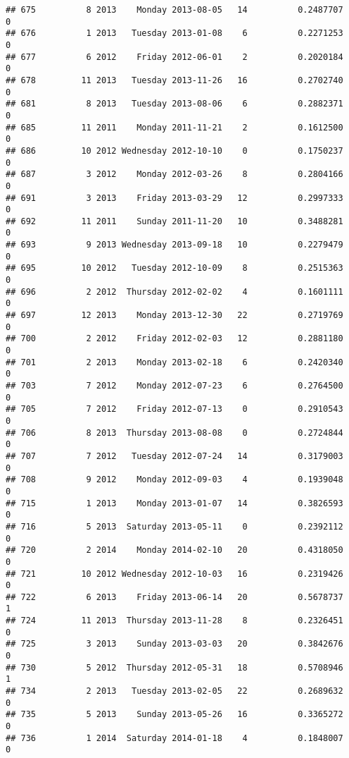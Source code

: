 \documentclass[
]{article}
\begin{document}
\begin{verbatim}
## 675          8 2013    Monday 2013-08-05   14          0.2487707             0
## 676          1 2013   Tuesday 2013-01-08    6          0.2271253             0
## 677          6 2012    Friday 2012-06-01    2          0.2020184             0
## 678         11 2013   Tuesday 2013-11-26   16          0.2702740             0
## 681          8 2013   Tuesday 2013-08-06    6          0.2882371             0
## 685         11 2011    Monday 2011-11-21    2          0.1612500             0
## 686         10 2012 Wednesday 2012-10-10    0          0.1750237             0
## 687          3 2012    Monday 2012-03-26    8          0.2804166             0
## 691          3 2013    Friday 2013-03-29   12          0.2997333             0
## 692         11 2011    Sunday 2011-11-20   10          0.3488281             0
## 693          9 2013 Wednesday 2013-09-18   10          0.2279479             0
## 695         10 2012   Tuesday 2012-10-09    8          0.2515363             0
## 696          2 2012  Thursday 2012-02-02    4          0.1601111             0
## 697         12 2013    Monday 2013-12-30   22          0.2719769             0
## 700          2 2012    Friday 2012-02-03   12          0.2881180             0
## 701          2 2013    Monday 2013-02-18    6          0.2420340             0
## 703          7 2012    Monday 2012-07-23    6          0.2764500             0
## 705          7 2012    Friday 2012-07-13    0          0.2910543             0
## 706          8 2013  Thursday 2013-08-08    0          0.2724844             0
## 707          7 2012   Tuesday 2012-07-24   14          0.3179003             0
## 708          9 2012    Monday 2012-09-03    4          0.1939048             0
## 715          1 2013    Monday 2013-01-07   14          0.3826593             0
## 716          5 2013  Saturday 2013-05-11    0          0.2392112             0
## 720          2 2014    Monday 2014-02-10   20          0.4318050             0
## 721         10 2012 Wednesday 2012-10-03   16          0.2319426             0
## 722          6 2013    Friday 2013-06-14   20          0.5678737             1
## 724         11 2013  Thursday 2013-11-28    8          0.2326451             0
## 725          3 2013    Sunday 2013-03-03   20          0.3842676             0
## 730          5 2012  Thursday 2012-05-31   18          0.5708946             1
## 734          2 2013   Tuesday 2013-02-05   22          0.2689632             0
## 735          5 2013    Sunday 2013-05-26   16          0.3365272             0
## 736          1 2014  Saturday 2014-01-18    4          0.1848007             0

\end{verbatim}
\end{document}
